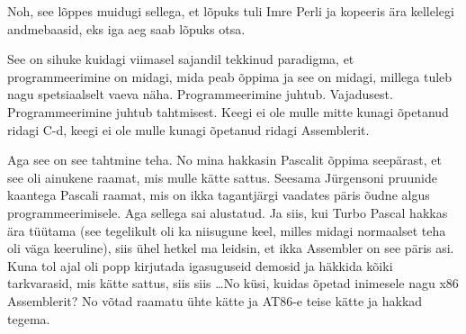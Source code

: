 Noh, see lõppes muidugi sellega, et lõpuks tuli Imre Perli ja kopeeris ära kellelegi andmebaasid, eks iga 
aeg saab lõpuks otsa. 


See on sihuke  kuidagi viimasel sajandil tekkinud paradigma, et 
programmeerimine on midagi, mida peab õppima ja see on midagi, millega tuleb 
nagu spetsiaalselt vaeva näha. Programmeerimine juhtub. Vajadusest. 
Programmeerimine juhtub tahtmisest. Keegi ei ole mulle mitte kunagi õpetanud 
ridagi C-d, keegi ei ole mulle kunagi õpetanud ridagi Assemblerit. 


Aga see on see tahtmine teha. No mina hakkasin  
Pascalit õppima seepärast, et see oli ainukene raamat, mis 
mulle kätte sattus. Seesama Jürgensoni pruunide kaantega Pascali  
raamat, mis on ikka tagantjärgi vaadates 
päris õudne algus programmeerimisele. Aga sellega sai alustatud. Ja siis, kui 
Turbo Pascal hakkas ära tüütama (see tegelikult oli ka niisugune 
keel, milles midagi normaalset teha oli väga keeruline), siis ühel hetkel ma 
leidsin, et ikka Assembler on see päris asi. Kuna tol 
ajal oli popp kirjutada igasuguseid demosid ja häkkida kõiki tarkvarasid, mis 
kätte sattus, siis siis \ldots No küsi, kuidas õpetad inimesele nagu x86 
Assemblerit? No võtad raamatu ühte kätte ja AT86-e teise kätte ja hakkad tegema.


